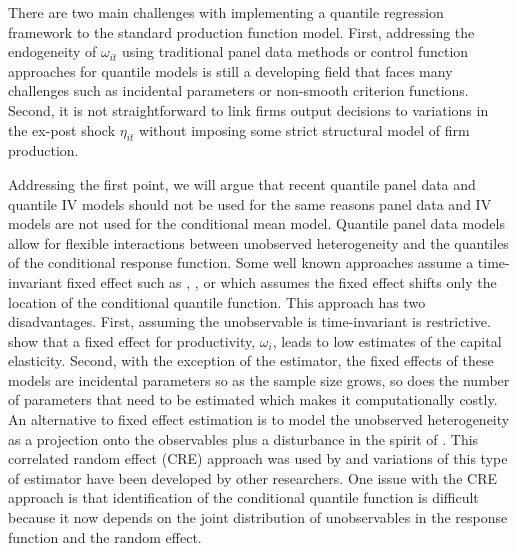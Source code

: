 \documentclass[11pt]{article}
\begin{document}
There are two main challenges with implementing a quantile regression framework to the standard production function model. First, addressing the endogeneity of $\omega_{it}$ using traditional panel data methods or control function approaches for quantile models is still a developing field that faces many challenges such as incidental parameters or non-smooth criterion functions. Second, it is not straightforward to link firms output decisions to variations in the ex-post shock $\eta_{it}$ without imposing some strict structural model of firm production.

Addressing the first point, we will argue that recent quantile panel data and quantile IV models should not be used for the same reasons panel data and IV models are not used for the conditional mean model. Quantile panel data models allow for flexible interactions between unobserved heterogeneity and the quantiles of the conditional response function. Some well known approaches assume a time-invariant fixed effect such as \cite{Koenker2004}, \cite{Lamarche2010}, or \cite{Canay2011} which assumes the fixed effect shifts only the location of the conditional quantile function. This approach has two disadvantages. First, assuming the unobservable is time-invariant is restrictive. \cite{Griliches1986} show that a fixed effect for productivity, $\omega_{i}$, leads to low estimates of the capital elasticity. Second, with the exception of the \cite{Canay2011} estimator, the fixed effects of these models are incidental parameters so as the sample size grows, so does the number of parameters that need to be estimated which makes it computationally costly. An alternative to fixed effect estimation is to model the unobserved heterogeneity as a projection onto the observables plus a disturbance in the spirit of \cite{Chamberlain1984}. This correlated random effect (CRE) approach was used by \cite{Abrevaya2008} and variations of this type of estimator have been developed by other researchers. One issue with the CRE approach is that identification of the conditional quantile function is difficult because it now depends on the joint distribution of unobservables in the response function and the random effect.
\end{document}
